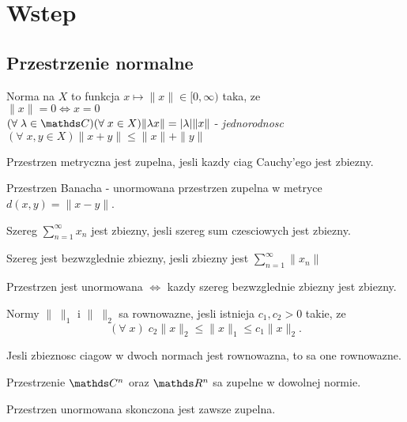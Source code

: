\section{Wstep}
\subsection{Przestrzenie normalne}

\begin{multicols}{2}
    
    {\color{def}Norma} na $X$ to funkcja $x\mapsto \|x\|\in[0, \infty)$ taka, ze\smallskip\\
        \point $\|x\|=0\iff x=0$\smallskip\\
        \point $(\forall\;\lambda\in\C)(\forall\;x\in X) \|\lambda x\|=|\lambda|\|x\|$ - \emph{jednorodnosc}\smallskip\\
        \point $(\forall\;x,y\in X)\| x+y\| \leq \|x\|+\|y\|$
    \bigskip

    Przestrzen metryczna jest {\color{def}zupelna}, jesli kazdy ciag Cauchy'ego jest zbiezny.
    \medskip

    {\color{def}Przestrzen Banacha} - unormowana przestrzen zupelna w metryce $d(x, y)=\|x-y\|$.
    \bigskip

    \pdef

    Szereg $\sum\limits_{n=1}^\infty x_n$ jest {\color{acc}zbiezny}, jesli szereg sum czesciowych jest zbiezny.\\

    \kdef

    Szereg jest {\color{acc}bezwzglednie zbiezny}, jesli zbiezny jest $\sum\limits_{n=1}^\infty\|x_n\|$
    \medskip

    \pdef
    
    Przestrzen jest unormowana $\iff$ kazdy szereg bezwzglednie zbiezny jest zbiezny.


    \kdef
    \medskip

    Normy $\|\;\|_1$ i $\|\;\|_2$ sa {\color{def}rownowazne}, jesli istnieja $c_1, c_2>0$ takie, ze
    $$(\forall\;x)\;c_2\|x\|_2\leq \|x\|_1\leq c_1\|x\|_2.$$

    {\color{acc}\point} Jesli zbieznosc ciagow w dwoch normach jest rownowazna, to sa one rownowazne.

    {\color{acc}\point} Przestrzenie $\C^n$ oraz $\R^n$ sa zupelne w dowolnej normie.

    {\color{acc}\point} Przestrzen unormowana skonczona jest zawsze zupelna.
    \medskip


\end{multicols}
